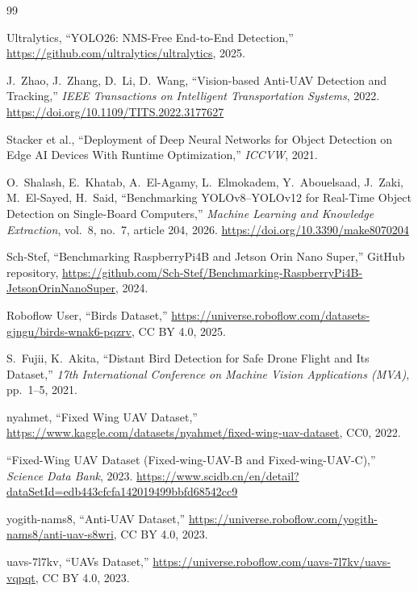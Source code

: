\documentclass[12pt,a4paper]{report}
\begin{document}
\begin{thebibliography}{99}

Ultralytics, ``YOLO26: NMS-Free End-to-End Detection,''
\url{https://github.com/ultralytics/ultralytics}, 2025.

J.\ Zhao, J.\ Zhang, D.\ Li, D.\ Wang,
``Vision-based Anti-UAV Detection and Tracking,''
\textit{IEEE Transactions on Intelligent Transportation Systems}, 2022.
\url{https://doi.org/10.1109/TITS.2022.3177627}

Stacker et al.,
``Deployment of Deep Neural Networks for Object Detection on Edge AI
Devices With Runtime Optimization,''
\textit{ICCVW}, 2021.

O.\ Shalash, E.\ Khatab, A.\ El-Agamy, L.\ Elmokadem, Y.\ Abouelsaad,
J.\ Zaki, M.\ El-Sayed, H.\ Said,
``Benchmarking YOLOv8--YOLOv12 for Real-Time Object Detection on
Single-Board Computers,''
\textit{Machine Learning and Knowledge Extraction}, vol.\ 8, no.\ 7,
article 204, 2026.
\url{https://doi.org/10.3390/make8070204}

Sch-Stef,
``Benchmarking RaspberryPi4B and Jetson Orin Nano Super,''
GitHub repository,
\url{https://github.com/Sch-Stef/Benchmarking-RaspberryPi4B-JetsonOrinNanoSuper},
2024.

Roboflow User, ``Birds Dataset,''
\url{https://universe.roboflow.com/datasets-gjngu/birds-wnak6-pqzrv},
CC BY 4.0, 2025.

S.\ Fujii, K.\ Akita,
``Distant Bird Detection for Safe Drone Flight and Its Dataset,''
\textit{17th International Conference on Machine Vision Applications (MVA)},
pp.\ 1--5, 2021.

nyahmet, ``Fixed Wing UAV Dataset,''
\url{https://www.kaggle.com/datasets/nyahmet/fixed-wing-uav-dataset},
CC0, 2022.

``Fixed-Wing UAV Dataset (Fixed-wing-UAV-B and Fixed-wing-UAV-C),''
\textit{Science Data Bank}, 2023.
\url{https://www.scidb.cn/en/detail?dataSetId=edb443cfcfa142019499bbfd68542cc9}

yogith-nams8, ``Anti-UAV Dataset,''
\url{https://universe.roboflow.com/yogith-nams8/anti-uav-s8wri},
CC BY 4.0, 2023.

uavs-7l7kv, ``UAVs Dataset,''
\url{https://universe.roboflow.com/uavs-7l7kv/uavs-vqpqt},
CC BY 4.0, 2023.


\end{thebibliography}
\end{document}
